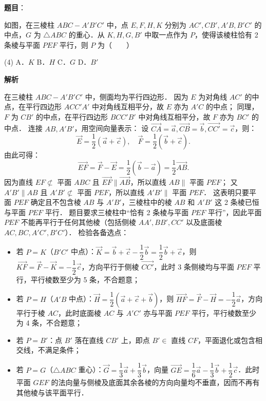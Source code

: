 \begin{answer}

\textbf{题目}：

如图，在三棱柱 $ABC - A'B'C'$ 中，点 $E, F, H, K$ 分别为 $AC', CB', A'B, B'C'$ 的中点，$G$ 为 $\triangle ABC$ 的重心．从 $K, H, G, B'$ 中取一点作为 $P$，使得该棱柱恰有 2 条棱与平面 $PEF$ 平行，则 $P$ 为\mbox{（　　）}
\nopagebreak[4]
\begin{center}\end{center}
\nopagebreak[4]
\begin{gkopts}(4)
\task A．$K$
\task B．$H$
\task C．$G$
\task D．$B'$
\end{gkopts}

\textbf{解析}

在三棱柱 $ABC - A'B'C'$ 中，侧面均为平行四边形．
因为 $E$ 为对角线 $AC'$ 的中点，在平行四边形 $ACC'A'$ 中对角线互相平分，故 $E$ 亦为 $A'C$ 的中点；
同理，$F$ 为 $CB'$ 的中点，在平行四边形 $BCC'B'$ 中对角线互相平分，故 $F$ 亦为 $BC'$ 的中点．
连接 $AB, A'B'$，用空间向量表示：
设 $\vec{CA} = \vec{a}, \vec{CB} = \vec{b}, \vec{CC'} = \vec{c}$，则：
\nopagebreak[4]
\[
\vec{E} = \frac{1}{2}(\vec{a} + \vec{c}), \quad \vec{F} = \frac{1}{2}(\vec{b} + \vec{c}).
\]
由此可得：
\nopagebreak[4]
\[
\vec{EF} = \vec{F} - \vec{E} = \frac{1}{2}(\vec{b} - \vec{a}) = \frac{1}{2}\vec{AB}.
\]
因为直线 $EF \not\subset$ 平面 $ABC$ 且 $\vec{EF} \parallel \vec{AB}$，所以直线 $AB \parallel$ 平面 $PEF$；
又 $A'B' \parallel AB$ 且 $A'B' \not\subset$ 平面 $PEF$，所以直线 $A'B' \parallel$ 平面 $PEF$．
这表明只要平面 $PEF$ 确定且不包含棱 $AB$ 与 $A'B'$，三棱柱中的棱 $AB$ 和 $A'B'$ 这 2 条棱已恒与平面 $PEF$ 平行．
题目要求三棱柱中“恰有 2 条棱与平面 $PEF$ 平行”，因此平面 $PEF$ 不能再平行于任何其他棱（包括侧棱 $AA', BB', CC'$ 以及底面棱 $AC, BC, A'C', B'C'$）．
检验各备选点：
\begin{itemize}
\item 若 $P = K$（$B'C'$ 中点）：$\vec{K} = \vec{b} + \vec{c} - \dfrac{1}{2}\vec{b} = \dfrac{1}{2}\vec{b} + \vec{c}$，则 $\vec{KF} = \vec{F} - \vec{K} = -\dfrac{1}{2}\vec{c}$，方向平行于侧棱 $\vec{CC'}$，此时 3 条侧棱均与平面 $PEF$ 平行，平行棱数至少为 5 条，不合题意；
\item 若 $P = H$（$A'B$ 中点）：$\vec{H} = \dfrac{1}{2}(\vec{a} + \vec{c} + \vec{b})$，则 $\vec{HF} = \vec{F} - \vec{H} = -\dfrac{1}{2}\vec{a}$，方向平行于棱 $AC$，此时底面棱 $AC$ 与 $A'C'$ 亦与平面 $PEF$ 平行，平行棱数至少为 4 条，不合题意；
\item 若 $P = B'$：点 $B'$ 落在直线 $CB'$ 上，即点 $B' \in$ 直线 $CF$，平面退化或包含相交线，不满足条件；
\item 若 $P = G$（$\triangle ABC$ 重心）：$\vec{G} = \dfrac{1}{3}\vec{a} + \dfrac{1}{3}\vec{b}$，向量 $\vec{GE} = \dfrac{1}{6}\vec{a} - \dfrac{1}{3}\vec{b} + \dfrac{1}{2}\vec{c}$．此时平面 $GEF$ 的法向量与侧棱及底面其余各棱的方向向量均不垂直，因而不再有其他棱与该平面平行．
\end{itemize}


\end{answer}
